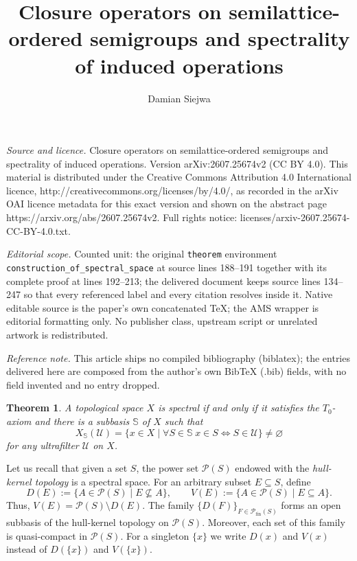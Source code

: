 \documentclass[10pt,a4paper]{amsart}
\newtheorem{theorem}{Theorem}[section]
\begin{document}
\title[Closure operators on semilattice-ordered semigroups and spec]{Closure operators on semilattice-ordered semigroups and spectrality of induced operations}
\author{Damian Siejwa}
\date{}
\maketitle
\noindent\emph{Source and licence.} Closure operators on semilattice-ordered semigroups and spectrality of induced operations. Version arXiv:2607.25674v2 (CC BY 4.0). This material is distributed under the Creative Commons Attribution 4.0 International licence, http://creativecommons.org/licenses/by/4.0/, as recorded in the arXiv OAI licence metadata for this exact version and shown on the abstract page https://arxiv.org/abs/2607.25674v2. Full rights notice: licenses/arxiv-2607.25674-CC-BY-4.0.txt.\par\smallskip
\noindent\textit{Editorial scope.} Counted unit: the original \texttt{theorem} environment \texttt{construction\_of\_spectral\_space} at source lines 188--191 together with its complete proof at lines 192--213; the delivered document keeps source lines 134--247 so that every referenced label and every citation resolves inside it. Native editable source is the paper's own concatenated TeX; the AMS wrapper is editorial formatting only. No publisher class, upstream script or unrelated artwork is redistributed.
\par\smallskip\noindent\textit{Reference note.} This article ships no compiled bibliography (biblatex); the entries delivered here are composed from the author's own BibTeX (.bib) fields, with no field invented and no entry dropped.
\begin{theorem}\cite[Corollary 3.3]{Finocchiaro03042014}\label{ultrafilter_criterion}
    A topological space $X$ is spectral if and only if it satisfies the $T_0$-axiom and there is a subbasis $\mathbb{S}$ of $X$ such that 
    \begin{equation*}
        X_{\mathbb{S}}(\mathscr{U}) = \{x \in X \mid \forall S\in\mathbb{S} \hspace{3pt} x\in S \iff S \in\mathscr{U}\} \neq \varnothing
    \end{equation*}
    for any ultrafilter $\mathscr{U}$ on $X$. 
\end{theorem}

Let us recall that given a set $S$, the power set $\mathcal{P}(S)$ endowed with the \emph{hull-kernel topology} is a spectral space. For an arbitrary subset $E \subseteq S$, define
\begin{equation*}
    D(E) := \{A \in \mathcal{P}(S) \mid E \nsubseteq A\}, \qquad V(E) := \{A \in \mathcal{P}(S) \mid E \subseteq A\}. 
\end{equation*}
Thus, $V(E) = \mathcal{P}(S) \setminus D(E)$. The family $\{D(F)\}_{F\in\mathcal{P}_\mathrm{fin}(S)}$ forms an open subbasis of the hull-kernel topology on $\mathcal{P}(S)$. Moreover, each set of this family is quasi-compact in $\mathcal{P}(S)$. For a singleton $\{x\}$ we write $D(x)$ and $V(x)$ instead of $D(\{x\})$ and $V(\{x\})$. 
\end{document}
